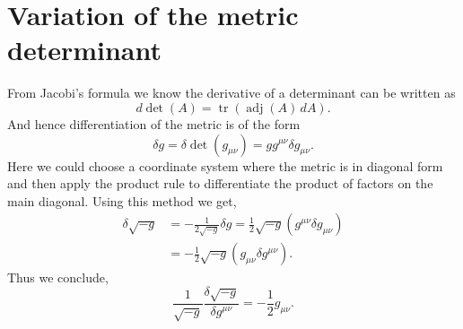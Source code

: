 \documentclass[12pt,a4paper,oneside]{book}
\newcommand{\eq}[2]{\begin{equation} \label{eq:#1} #2 \end{equation}}
\newcommand{\aeq}[2]{\begin{align} \label{eq:#1} #2 \end{align}}
\begin{document}
\section{Variation of the metric determinant}
From Jacobi's formula we know the derivative of a determinant can be written as
\eq{}{d\det(A)=\operatorname {tr} (\operatorname {adj} (A)\,dA).}
And hence differentiation of the metric is of the form
\eq{}{\delta g=\delta \det(g_{\mu \nu })=gg^{\mu \nu }\delta g_{\mu \nu }.}
Here we could choose a coordinate system where the metric is in diagonal form and then apply the product rule to differentiate the product of factors on the main diagonal. Using this method we get,
\aeq{}{ \delta {\sqrt {-g}}&=-{\frac {1}{2{\sqrt {-g}}}}\delta g={\frac {1}{2}}{\sqrt {-g}}\left(g^{\mu \nu }\delta g_{\mu \nu }\right)\nonumber\\
&=-{\frac {1}{2}}{\sqrt {-g}}\left(g_{\mu \nu }\delta g^{\mu \nu }\right).}
Thus we conclude,
\eq{A.8}{{\frac {1}{\sqrt {-g}}}{\frac {\delta {\sqrt {-g}}}{\delta g^{\mu \nu }}}=-{\frac {1}{2}}g_{\mu \nu }.}

\end{document}
